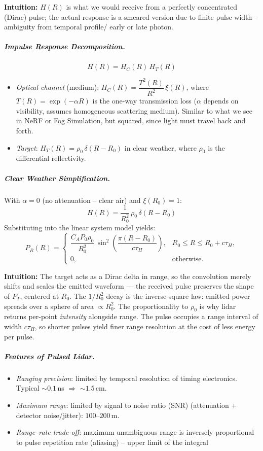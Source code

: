 \documentclass{article}
\begin{document}
\textbf{Intuition:} $H(R)$ is what we would receive from a perfectly concentrated (Dirac) pulse; the actual response is a smeared version due to finite pulse width - ambiguity from temporal profile/ early or late photon.

\subparagraph{Impulse Response Decomposition.}
\begin{equation*}
    H(R) = H_C(R)\, H_T(R)
\end{equation*}
\begin{itemize}
    \item \textit{Optical channel} (medium): $H_C(R) = \dfrac{T^2(R)}{R^2}\,\xi(R)$, \quad where $T(R) = \exp(-\alpha R)$ is the one-way transmission loss ($\alpha$ depends on visibility, assumes homogeneous scattering medium). Similar to what we see in NeRF or Fog Simulation, but squared, since light must travel back and forth.
    \item \textit{Target}: $H_T(R) = \rho_0\,\delta(R - R_0)$ in clear weather, where $\rho_0$ is the differential reflectivity.
\end{itemize}
 
\subparagraph{Clear Weather Simplification.}
With $\alpha = 0$ (no attenuation -- clear air) and $\xi(R_0)=1$:
\begin{equation*}
    H(R) = \frac{1}{R_0^2}\,\rho_0\,\delta(R - R_0)
\end{equation*}
Substituting into the linear system model yields:
\begin{equation*}
    P_R(R) = \begin{cases} \dfrac{C_A P_0 \rho_0}{R_0^2}\, \sin^2\!\left(\dfrac{\pi(R-R_0)}{c\tau_H}\right), & R_0 \leq R \leq R_0 + c\tau_H, \\ 0, & \text{otherwise.} \end{cases}
\end{equation*}
 
\textbf{Intuition:} The target acts as a Dirac delta in range, so the convolution merely shifts and scales the emitted waveform — the received pulse preserves the shape of $P_T$, centered at $R_0$. The $1/R_0^2$ decay is the inverse-square law: emitted power spreads over a sphere of area $\propto R_0^2$. The proportionality to $\rho_0$ is why lidar returns per-point \textit{intensity} alongside range. The pulse occupies a range interval of width $c\tau_H$, so shorter pulses yield finer range resolution at the cost of less energy per pulse.

\subparagraph{Features of Pulsed Lidar.}
\begin{itemize}
    \item \textit{Ranging precision}: limited by temporal resolution of timing electronics. Typical $\sim 0.1$\,ns $\Rightarrow$ $\sim 1.5$\,cm.
    \item \textit{Maximum range}: limited by signal to noise ratio (SNR) (attenuation + detector noise/jitter): $100$--$200$\,m.
    \item \textit{Range--rate trade-off}: maximum unambiguous range is inversely proportional to pulse repetition rate (aliasing) -- upper limit of the integral
\end{itemize}
\end{document}
